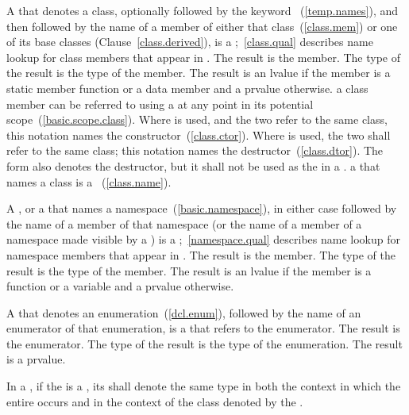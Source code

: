 A  that denotes a class, optionally
followed by the keyword ~(\ref{temp.names}), and then
followed by the name of a member of either that class~(\ref{class.mem})
or one of its base classes (Clause~\ref{class.derived}), is a
%
;~\ref{class.qual} describes name lookup for
class members that appear in . The result is the
member. The type of the result is the type of the member. The result is
an lvalue if the member is a static member function or a data member and a
prvalue otherwise.
\enternote 
a class member can be referred to using a  at any
point in its potential scope~(\ref{basic.scope.class}).
\exitnote 
Where  \tcode{::}  is used,
and the two  refer to the same class, this
notation names the constructor~(\ref{class.ctor}). Where
 \tcode{::\tilde}  is used,
the two  shall refer to the same class; this
notation names the destructor~(\ref{class.dtor}).
The form \grammarterm{\tilde}  also denotes the destructor,
but it shall not be used as the  in a .
\enternote 
a  that names a class is a
~(\ref{class.name}).
\exitnote 

\pnum
A \tcode{::}, or a  that names a
namespace~(\ref{basic.namespace}), in either case followed by the name of a member of
that namespace (or the name of a member of a namespace made visible by a
) is a
%
;~\ref{namespace.qual} describes name lookup for
namespace members that appear in . The result is
the member. The type of the result is the type of the member. The result
is an lvalue if the member is a function or a variable and a prvalue otherwise.

\pnum
A  that denotes an
enumeration~(\ref{dcl.enum}), followed by the name of an
enumerator of that enumeration, is a 
that refers to the enumerator. The result is the enumerator. The type
of the result is the type of the enumeration. The result is a prvalue.

\pnum
In a , if the
is a
, its 
shall denote the same type in both the context in which the entire
 occurs and in the context of the class denoted
by the .


